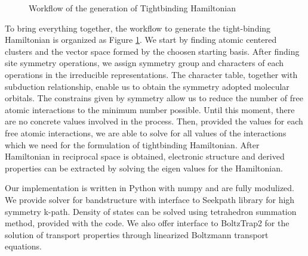 \documentclass{article}
\begin{document}
\begin{figure}[h!]
    \centering
    \caption{Workflow of the generation of Tightbinding Hamiltonian}
    \label{F:workflow_Hamiltonian}
\end{figure}

To bring everything together, the workflow to generate the tight-binding Hamiltonian 
is organized as Figure \ref{F:workflow_Hamiltonian}. We start by finding atomic centered 
clusters and the vector space formed by the choosen starting basis. After finding 
site symmetry operations, we assign symmetry group and characters of each operations in the 
irreducible representations. The character table, together with subduction relationship, 
enable us to obtain the symmetry adopted molecular orbitals. The constrains 
given by symmetry allow us to reduce the number of free atomic interactions to the minimum 
number possible. Until this moment, there are no concrete values involved in the process.
Then, provided the values for each free atomic interactions, we are able to solve 
for all values of the interactions which we need for the formulation of tightbinding Hamiltonian.
After Hamiltonian in reciprocal space is obtained, electronic structure and derived properties 
can be extracted by solving the eigen values for the Hamiltonian. 

Our implementation is written in Python with numpy and are fully modulized. We provide solver 
for bandstructure with interface to Seekpath library for high symmetry k-path. Density of states
can be solved using tetrahedron summation method, provided with the code. We also offer 
interface to BoltzTrap2 for the solution of transport properties through linearized Boltzmann 
transport equations.
\end{document}
